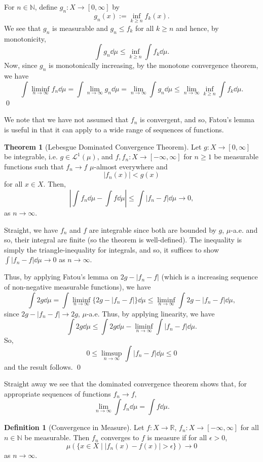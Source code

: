 \documentclass[
]{article}
\theoremstyle{definition}
\newtheorem{theorem}{Theorem}
\theoremstyle{definition}
\newtheorem{definition}{Definition}[section]
\begin{document}
For \(n \in \mathbb{N}\), define \(g_n : X \to [0, \infty]\) by
\[g_n(x) := \inf_{k \ge n} f_k(x).\] We see that \(g_n\) is measurable
and \(g_n \le f_k\) for all \(k \ge n\) and hence, by monotonicity,
\[\int g_n \dd \mu \le \inf_{k \ge n} \int f_k \dd \mu.\] Now, since
\(g_n\) is monotonically increasing, by the monotone convergence
theorem, we have \[\int \liminf_{n \to \infty} f_n \dd \mu 
    = \int \lim_{n \to \infty} g_n \dd \mu 
    = \lim_{n \to \infty} \int g_n \dd \mu 
    \le \lim_{n \to \infty} \inf_{k \ge n} \int f_k \dd \mu.\] \qed

We note that we have not assumed that \(f_n\) is convergent, and so,
Fatou's lemma is useful in that it can apply to a wide range of
sequences of functions.

\begin{theorem}[Lebesgue Dominated Convergence Theorem]
  Let \(g : X \to [0, \infty]\) be integrable, i.e. \(g \in \mathcal{L}^1(\mu)\), 
  and \(f, f_n : X \to [- \infty, \infty]\) for \(n \ge 1\) be measurable functions 
  such that \(f_n \to f\) \(\mu\)-almost everywhere and 
  \[| f_n(x) | < g(x)\]
  for all \(x \in X\). Then, 
  \[\left| \int f_n \dd \mu - \int f \dd \mu \right| \le \int |f_n - f| \dd \mu \to 0,\]
  as \(n \to \infty\).
\end{theorem}
\proof

Straight, we have \(f_n\) and \(f\) are integrable since both are
bounded by \(g\), \(\mu\)-a.e. and so, their integral are finite (so the
theorem is well-defined). The inequality is simply the
triangle-inequality for integrals, and so, it suffices to show
\(\int |f_n - f| \dd \mu \to 0\) as \(n \to \infty\).

Thus, by applying Fatou's lemma on \(2g - |f_n - f|\) (which is a
increasing sequence of non-negative measurable functions), we have
\[\int 2g \dd \mu = \int \liminf_{n \to \infty} \{2g - |f_n - f|\} \dd \mu \le \liminf_{n \to \infty} 
    \int 2g - |f_n - f| \dd \mu, \] since \(2g - |f_n - f| \to 2g\),
\(\mu\)-a.e. Thus, by applying linearity, we have
\[\int 2g \dd \mu \le \int 2g \dd \mu - \liminf_{n \to \infty} \int |f_n - f| \dd \mu.\]
So, \[0 \le \limsup_{n \to \infty} \int |f_n - f| \dd \mu \le 0\] and
the result follows. \qed

Straight away we see that the dominated convergence theorem shows that,
for appropriate sequences of functions \(f_n \to f\),
\[\lim_{n \to \infty} \int f_n \dd \mu = \int f \dd \mu.\]

\begin{definition}[Convergence in Measure]
  Let \(f : X \to \mathbb{R}\), \(f_n : X \to [-\infty, \infty]\) for all \(n \in \mathbb{N}\)
  be measurable. Then \(f_n\) converges to \(f\) is measure if for all \(\epsilon > 0\), 
  \[\mu(\{x \in X \mid | f_n(x) - f(x) | > \epsilon\}) \to 0\]
  as \(n \to \infty\).
\end{definition}
\end{document}
